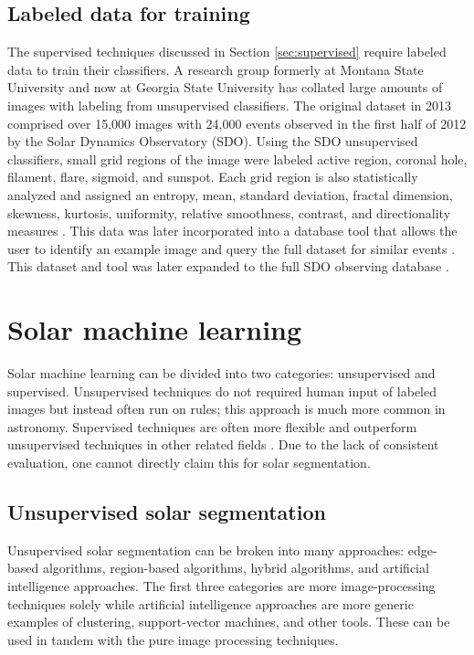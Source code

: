 \documentclass[twoside]{report}
\begin{document}
\subsection{Labeled data for training} 
The supervised techniques discussed in Section \ref{sec:supervised} require labeled data to train their classifiers. A research group formerly at Montana State University and now at Georgia State University has collated large amounts of images with labeling from unsupervised classifiers. The original dataset in 2013 comprised over 15,000 images with 24,000 events observed in the first half of 2012 by the Solar Dynamics Observatory (SDO). Using the SDO unsupervised classifiers, small grid regions of the image were labeled active region, coronal hole, filament, flare, sigmoid, and sunspot. Each grid region is also statistically analyzed and assigned an entropy, mean, standard deviation, fractal dimension, skewness, kurtosis, uniformity, relative smoothness, contrast, and directionality measures \cite{schuh:2013}. This data was later incorporated into a database tool that allows the user to identify an example image and query the full dataset for similar events \cite{banda:2014}. This dataset and tool was later expanded to the full SDO observing database \cite{schuh:2016}. 

\section{Solar machine learning}
Solar machine learning can be divided into two categories: unsupervised and supervised. Unsupervised techniques do not required human input of labeled images but instead often run on rules; this approach is much more common in astronomy. Supervised techniques are often more flexible and outperform unsupervised techniques in other related fields \cite{anzanello:2014, yu:2013,guerra:2011, huang:2017}. Due to the lack of consistent evaluation, one cannot directly claim this for solar segmentation.

\subsection{Unsupervised solar segmentation} \label{sec:unsupervised}
Unsupervised solar segmentation can be broken into many approaches: edge-based algorithms, region-based algorithms, hybrid algorithms, and artificial intelligence approaches. The first three categories are more image-processing techniques solely while artificial intelligence approaches are more generic examples of clustering, support-vector machines, and other tools. These can be used in tandem with the pure image processing techniques. 
\end{document}
